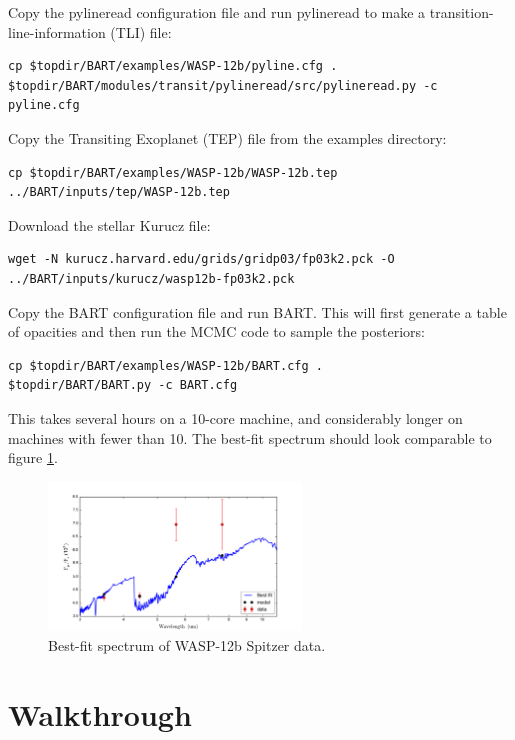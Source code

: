 \documentclass[letterpaper, 12pt]{article}
\begin{document}
\noindent Copy the pylineread configuration file and run pylineread to make a transition-line-information (TLI) file:
{\fontsize{9.8}{1em}\selectfont
\begin{verbatim}
cp $topdir/BART/examples/WASP-12b/pyline.cfg .
$topdir/BART/modules/transit/pylineread/src/pylineread.py -c pyline.cfg
\end{verbatim}}

\noindent Copy the Transiting Exoplanet (TEP) file from the examples directory:
{\fontsize{9.8}{1em}\selectfont
\begin{verbatim}
cp $topdir/BART/examples/WASP-12b/WASP-12b.tep ../BART/inputs/tep/WASP-12b.tep
\end{verbatim}}

\noindent Download the stellar Kurucz file:
{\fontsize{9.8}{1em}\selectfont
\begin{verbatim}
wget -N kurucz.harvard.edu/grids/gridp03/fp03k2.pck -O ../BART/inputs/kurucz/wasp12b-fp03k2.pck
\end{verbatim}}
\noindent Copy the BART configuration file and run BART. This will
first generate a table of opacities and then run the MCMC code to
sample the posteriors:

{\fontsize{9.8}{1em}\selectfont
\begin{verbatim}
cp $topdir/BART/examples/WASP-12b/BART.cfg .
$topdir/BART/BART.py -c BART.cfg
\end{verbatim}}

\noindent This takes several hours on a 10-core machine, and
considerably longer on machines with fewer than 10. The best-fit
spectrum should look comparable to figure \ref{fig:wasp12}.

\begin{figure}[htb]
\centerline{
\includegraphics[width=0.6\textwidth, clip]{figs/WASP-12b-Spectrum}}
\caption{\small \label{fig:wasp12} Best-fit spectrum of WASP-12b Spitzer data.}
\end{figure}

\section{Walkthrough}
\label{sec:walk}
\end{document}
